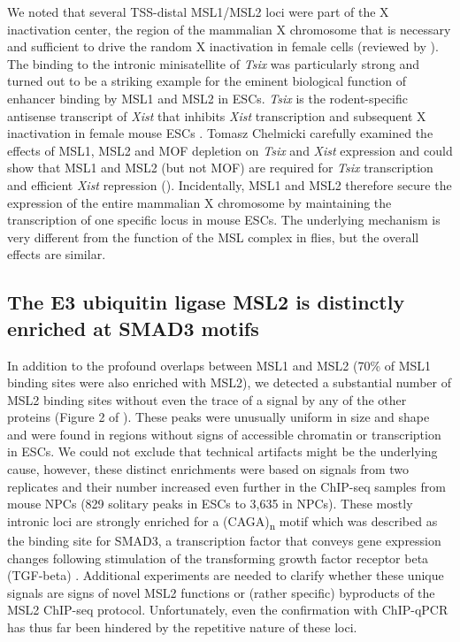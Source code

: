 We noted that several TSS-distal MSL1/MSL2 loci were part of the X inactivation center, the region of the mammalian X chromosome that is necessary and sufficient to drive the random X inactivation in female cells (reviewed by \citet{Pollex2012}). The binding to the intronic minisatellite of \textit{Tsix} was particularly strong and turned out to be a striking example for the eminent biological function of enhancer binding by MSL1 and MSL2 in ESCs. \textit{Tsix} is the rodent-specific antisense transcript of \textit{Xist} that inhibits \textit{Xist} transcription and subsequent X inactivation in female mouse ESCs \citep{Pollex2012}. Tomasz Chelmicki carefully examined the effects of MSL1, MSL2 and MOF depletion on \textit{Tsix} and \textit{Xist} expression and could show that MSL1 and MSL2 (but not MOF) are required for \textit{Tsix} transcription and efficient \textit{Xist} repression (). Incidentally, MSL1 and MSL2 therefore secure the expression of the entire mammalian X chromosome by maintaining the transcription of one specific locus in mouse ESCs. The underlying mechanism is very different from the function of the MSL complex in flies, but the overall effects are similar.
%
\subsection{The E3 ubiquitin ligase MSL2 is distinctly enriched at SMAD3 motifs}
%
In addition to the profound overlaps between MSL1 and MSL2 (70\% of MSL1 binding sites were also enriched with MSL2), we detected a substantial number of MSL2 binding sites without even the trace of a signal by any of the other proteins (Figure 2 of ). These peaks were unusually uniform in size and shape and were found in regions without signs of accessible chromatin or transcription in ESCs. We could not exclude that technical artifacts might be the underlying cause, however, these distinct enrichments were based on signals from two replicates and their number increased even further in the ChIP-seq samples from mouse NPCs (829 solitary peaks in ESCs to 3,635 in NPCs). These mostly intronic loci are strongly enriched for a (CAGA)\textsubscript{n} motif which was described as the binding site for SMAD3, a transcription factor that conveys gene expression changes following stimulation of the transforming growth factor receptor beta (TGF-beta) \citep{Zawel1998}. Additional experiments are needed to clarify whether these unique signals are signs of novel MSL2 functions or (rather specific) byproducts of the MSL2 ChIP-seq protocol. Unfortunately, even the confirmation with ChIP-qPCR has thus far been hindered by the repetitive nature of these loci.
%
